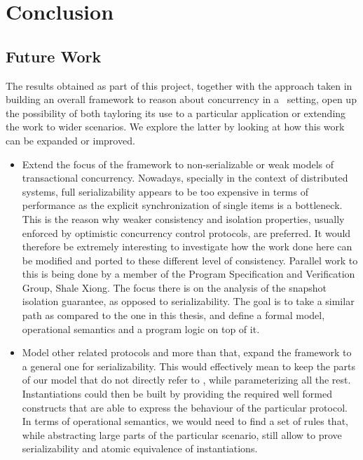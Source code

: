 \section{Conclusion}

\subsection{Future Work}

The results obtained as part of this project, together with the approach taken in building an overall framework to reason about concurrency in a \tpl\ setting, open up the possibility of both tayloring its use to a particular application or extending the work to wider scenarios. We explore the latter by looking at how this work can be expanded or improved.
\begin{itemize}
	\item Extend the focus of the framework to non-serializable or weak models of transactional concurrency. Nowadays, specially in the context of distributed systems, full serializability appears to be too expensive in terms of performance as the explicit synchronization of single items is a bottleneck. This is the reason why weaker consistency and isolation properties, usually enforced by optimistic concurrency control protocols, are preferred. It would therefore be extremely interesting to investigate how the work done here can be modified and ported to these different level of consistency.  Parallel work to this is being done by a member of the Program Specification and Verification Group, Shale Xiong. The focus there is on the analysis of the snapshot isolation guarantee, as opposed to serializability. The goal is to take a similar path as compared to the one in this thesis, and define a formal model, operational semantics and a program logic on top of it.
	
	\item Model other related protocols and more than that, expand the framework to a general one for serializability. This would effectively mean to keep the parts of our model that do not directly refer to \tpl, while parameterizing all the rest. Instantiations could then be built by providing the required well formed constructs that are able to express the behaviour of the particular protocol. In terms of operational semantics, we would need to find a set of rules that, while abstracting large parts of the particular scenario, still allow to prove serializability and atomic equivalence of instantiations.
	

\end{itemize}
